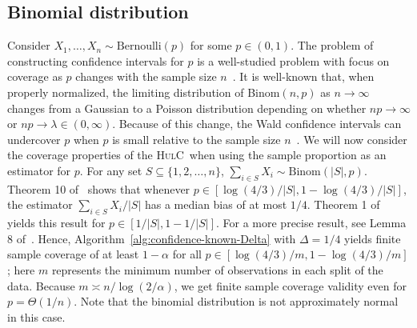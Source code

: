 \documentclass{article}
\newcommand{\hulc}{\textsc{HulC}~}
\numberwithin{myalgctr}{section}
\begin{document}
\subsection{Binomial distribution}
Consider $X_1, \ldots, X_n\sim \mbox{Bernoulli}(p)$ for some $p\in(0, 1)$. The problem of constructing confidence intervals for $p$ is a well-studied problem with focus on coverage as $p$ changes with the sample size $n$~\citep{brown2002confidence}. It is well-known that{\color{black}, when properly normalized,} the limiting distribution of Binom$(n, p)$ as $n\to\infty$ changes from a Gaussian to a Poisson distribution depending on whether $np\to\infty$ or $np\to\lambda\in(0,\infty)$. Because of this change, the Wald confidence intervals can undercover $p$ when $p$ is small relative to the sample size $n$~\citep{brown2001interval}. We will now consider the coverage properties of the \hulc when using the sample proportion as an estimator for $p$. For any set $S\subseteq\{1,2,\ldots,n\}$,
$\sum_{i\in S}X_i \sim \mbox{Binom}(|S|, p).$
Theorem 10 of~\cite{doerr2018elementary} shows that whenever $p\in[\log(4/3)/|S|, 1 - \log(4/3)/|S|]$, the estimator $\sum_{i\in S}X_i/|S|$ has a median bias of at most $1/4$.
Theorem 1 of~\cite{greenberg2014tight} yields this result for $p\in[1/|S|, 1 - 1/|S|]$. For a more precise result, see Lemma 8 of~\cite{doerr2018elementary}.
Hence, Algorithm~\ref{alg:confidence-known-Delta} with $\Delta=1/4$ yields finite sample coverage {\color{black}of at least $1-\alpha$} for all $p\in[\log(4/3)/m, 1 - \log(4/3)/m]$; here $m$ represents the minimum number of observations in each split of the data. Because $m \asymp n/\log(2/\alpha)$, we get finite sample coverage validity even for $p = \Theta(1/n)$. Note that the binomial distribution is not approximately normal in this case. 
\end{document}
